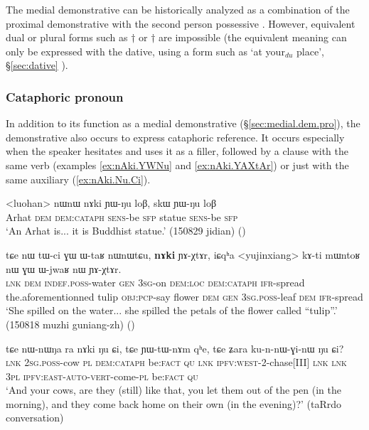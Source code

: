The medial demonstrative  can be historically analyzed as a combination of the proximal demonstrative  with the second person possessive . However, equivalent dual or plural forms such as  $\dagger$ or $\dagger$ are impossible (the equivalent meaning can only be expressed with the dative, using a form such as  `at your$_{du}$ place', §\ref{sec:dative} ).


\subsubsection{Cataphoric pronoun}
\label{sec:cataph.pron}
In addition to its function as a medial demonstrative (§\ref{sec:medial.dem.pro}), the demonstrative  also occurs to express cataphoric reference. It occurs especially when the speaker hesitates and uses it as a filler, followed by a clause with the same verb (examples \ref{ex:nAki.YWNu} and \ref{ex:nAki.YAXtAr}) or just with the same auxiliary (\ref{ex:nAki.Nu.Ci}).

\begin{exe}
\ex \label{ex:nAki.YWNu}
 \gll <luohan> nɯnɯ nɤki ɲɯ-ŋu loβ, skɯ ɲɯ-ŋu loβ \\
 Arhat \textsc{dem} \textsc{dem}:\textsc{cataph} \textsc{sens}-be \textsc{sfp} statue \textsc{sens}-be \textsc{sfp} \\
\glt `An Arhat is... it is Buddhist statue.' (150829 jidian)
()
\end{exe}

\begin{exe}
\ex \label{ex:nAki.YAXtAr}
 \gll tɕe nɯ tɯ-ci ɣɯ ɯ-taʁ nɯnɯtɕu, \textbf{nɤki} ɲɤ-χtɤr, iɕqʰa <yujinxiang> kɤ-ti mɯntoʁ nɯ ɣɯ  ɯ-jwaʁ nɯ ɲɤ-χtɤr.  \\
\textsc{lnk} \textsc{dem} \textsc{indef}.\textsc{poss}-water \textsc{gen} \textsc{3sg}-on \textsc{dem}:\textsc{loc} \textsc{dem}:\textsc{cataph} \textsc{ifr}-spread the.aforementionned tulip \textsc{obj}:\textsc{pcp}-say flower \textsc{dem} \textsc{gen} \textsc{3sg}.\textsc{poss}-leaf \textsc{dem} \textsc{ifr}-spread \\
\glt `She spilled on the water...  she spilled the petals of the flower called ``tulip''.' (150818 muzhi guniang-zh) ()
\end{exe}

\begin{exe}
\ex \label{ex:nAki.Nu.Ci}
 \gll tɕe nɯ-nɯŋa ra nɤki ŋu ɕi, tɕe ɲɯ-tɯ-nɤm qʰe, tɕe ʑara ku-n-nɯ-ɣi-nɯ ŋu ɕi? \\
\textsc{lnk} \textsc{2sg}.\textsc{poss}-cow \textsc{pl} \textsc{dem}:\textsc{cataph} be:\textsc{fact} \textsc{qu} \textsc{lnk} \textsc{ipfv}:\textsc{west}-2-chase[III] \textsc{lnk} \textsc{lnk} \textsc{3pl} \textsc{ipfv}:\textsc{east}-\textsc{auto}-\textsc{vert}-come-\textsc{pl} be:\textsc{fact} \textsc{qu} \\
\glt `And your cows, are they (still) like that, you let them out of the pen (in the morning), and  they come back home on their own (in the evening)?' (taRrdo conversation)
\end{exe}

